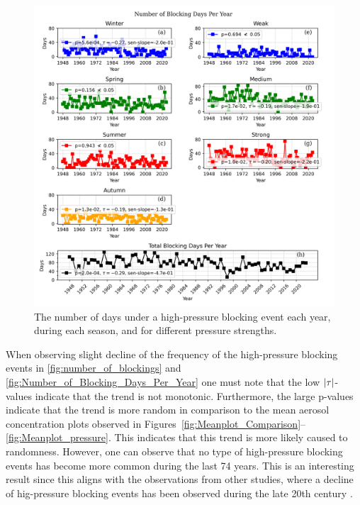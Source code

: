 \begin{figure}[H]
    \centering
    \includegraphics[width=\textwidth]{Figures/blocking_days_per_year_all.png}
    \caption{The number of days under a high-pressure blocking event each year, during each season, and for different pressure strengths.}
    \label{fig:Number_of_Blocking_Days_Per_Year}
\end{figure}

When observing slight decline of the frequency of the high-pressure blocking events in \autoref{fig:number_of_blockings} and \autoref{fig:Number_of_Blocking_Days_Per_Year} one must note that the low $\left| \tau \right|$-values indicate that the trend is not monotonic. Furthermore, the large p-values indicate that the trend is more random in comparison to the mean aerosol concentration plots observed in Figures~\ref{fig:Meanplot_Comparison}--\ref{fig:Meanplot_pressure}. This indicates that this trend is more likely caused to randomness. However, one can observe that no type of high-pressure blocking events has become more common during the last 74 years. This is an interesting result since this aligns with the observations from other studies, where a decline of hig-pressure blocking events has been observed during the late 20th century \cite{lupoAtmosphericBlockingEvents2020}. 
